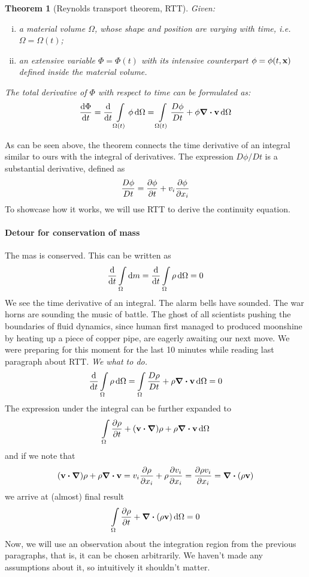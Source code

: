 \documentclass[a4paper]{article}
\newtheorem{theorem}{Theorem}
\begin{document}
\begin{theorem}[Reynolds transport theorem, RTT]
	Given:
	\begin{enumerate}[(i)]
		\item a material volume \(\Omega\), whose shape and position are varying with time,
		      i.e.\ \(\Omega = \Omega(t)\);
		\item an extensive variable \(\Phi = \Phi(t)\) with its intensive counterpart
		      \(\phi = \phi(t, \vb{x})\)  defined inside the material volume.
	\end{enumerate}
	The total derivative of \(\Phi\) with respect to time can be formulated as:
	\begin{equation}
		\dv{\Phi}{t} = \dv{t} \int\limits_{\Omega(t)} \phi \dd{\Omega}
		= \int\limits_{\Omega(t)} \dfrac{D\phi}{Dt} + \phi \div{\vb{v}} \dd{\Omega}
	\end{equation}
\end{theorem}

As can be seen above, the theorem connects the time derivative of an integral
similar to ours with the integral of derivatives. The expression \(D\phi/Dt\)
is a substantial derivative, defined as
\[
	\dfrac{D\phi}{Dt} = \pdv{\phi}{t} + v_i\pdv{\phi}{x_i}
\]
To showcase how it works, we will use RTT to derive the continuity equation.

\paragraph{Detour for conservation of mass}
The mas is conserved. This can be written as
\[
	\dv{t}\int\limits_\Omega \dd{m} =
	\dv{t}\int\limits_\Omega \rho\dd{\Omega} = 0
\]
We see the time derivative of an integral. The alarm bells have sounded.
The war horns are sounding the music of battle. The ghost of all scientists
pushing the boundaries of fluid dynamics, since human first managed to produced
moonshine by heating up a piece of copper pipe, are eagerly awaiting our next
move. We were preparing for this moment
for the last 10 minutes while reading last paragraph about RTT.
\emph{We what to do.}
\[
	\dv{t}\int\limits_\Omega \rho\dd{\Omega} =
	\int\limits_\Omega  \dfrac{D\rho}{Dt} + \rho\div{\vb{v}}\dd{\Omega}
	=  0
\]
The expression under the integral can be further expanded to
\[
	\int\limits_\Omega  \pdv{\rho}{t} + (\vb{v}\dotproduct\grad)\rho
	+ \rho\div{\vb{v}}\dd{\Omega}
\]
and if we note that
\[
	(\vb{v}\dotproduct\grad)\rho + \rho\div{\vb{v}} =
	v_i \pdv{\rho}{x_i} + \rho\pdv{v_i}{x_i} = \pdv{\rho v_i}{x_i}
	= \div{(\rho \vb{v})}
\]
we arrive at (almost) final result
\[
	\int\limits_\Omega  \pdv{\rho}{t} + \div{(\rho \vb{v})}\dd{\Omega} = 0
\]
Now, we will use an observation about the integration region from the
previous paragraphs, that is, it can be chosen arbitrarily. We haven't
made any assumptions about it, so intuitively it shouldn't matter.
\end{document}
